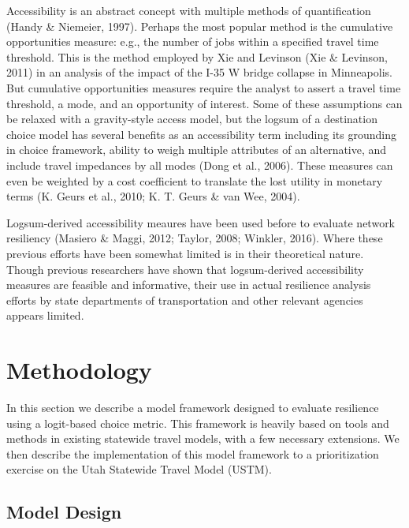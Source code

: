 \documentclass[
  letterpaper,
  number,
  review,
  3p]{elsarticle}
\begin{document}
Accessibility is an abstract concept with multiple methods of
quantification (Handy \& Niemeier, 1997). Perhaps the most popular
method is the cumulative opportunities measure: e.g., the number of jobs
within a specified travel time threshold. This is the method employed by
Xie and Levinson (Xie \& Levinson, 2011) in an analysis of the impact of
the I-35 W bridge collapse in Minneapolis. But cumulative opportunities
measures require the analyst to assert a travel time threshold, a mode,
and an opportunity of interest. Some of these assumptions can be relaxed
with a gravity-style access model, but the logsum of a destination
choice model has several benefits as an accessibility term including its
grounding in choice framework, ability to weigh multiple attributes of
an alternative, and include travel impedances by all modes (Dong et al.,
2006). These measures can even be weighted by a cost coefficient to
translate the lost utility in monetary terms (K. Geurs et al., 2010; K.
T. Geurs \& van Wee, 2004).

Logsum-derived accessibility meaures have been used before to evaluate
network resiliency (Masiero \& Maggi, 2012; Taylor, 2008; Winkler,
2016). Where these previous efforts have been somewhat limited is in
their theoretical nature. Though previous researchers have shown that
logsum-derived accessibility measures are feasible and informative,
their use in actual resilience analysis efforts by state departments of
transportation and other relevant agencies appears limited.


\hypertarget{methodology}{%
\section{Methodology}\label{methodology}}

In this section we describe a model framework designed to evaluate
resilience using a logit-based choice metric. This framework is heavily
based on tools and methods in existing statewide travel models, with a
few necessary extensions. We then describe the implementation of this
model framework to a prioritization exercise on the Utah Statewide
Travel Model (USTM).

\hypertarget{model-design}{%
\subsection{Model Design}\label{model-design}}
\end{document}
